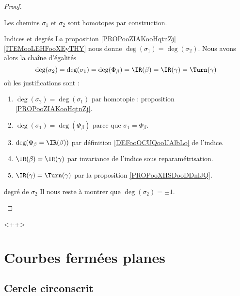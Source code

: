 \begin{proof}
\begin{subproof}
            Les chemins \( \sigma_1\) et \( \sigma_2\) sont homotopes par construction.
        \item[Indices et degrés]
            La proposition \ref{PROPooZIAKooHqtnZj}\ref{ITEMooLEHFooXEyTHY} nous donne \( \deg(\sigma_1)=\deg(\sigma_2)\). Nous avons alors la chaîne d'égalités
            \begin{equation}
                \deg(\sigma_2)=\deg(\sigma_1)=\deg(\Phi_{\beta})=\IR(\beta)=\IR(\gamma)=\Turn(\gamma)
            \end{equation}
            où les justifications sont :
            \begin{enumerate}
                \item
                    \( \deg(\sigma_2)=\deg(\sigma_1)\) par homotopie : proposition \ref{PROPooZIAKooHqtnZj}.
                \item
                    \( \deg(\sigma_1)=\deg(\Phi_{\beta})\) parce que \( \sigma_1=\Phi_{\beta}\).
                \item
                    \( \deg(\Phi_{\beta}=\IR(\beta))\) par définition \ref{DEFooOCUQooUAlbLo} de l'indice.
                \item
                    \(  \IR(\beta)=\IR(\gamma) \) par invariance de l'indice sous reparamétrisation.
                \item
                    \( \IR(\gamma)=\Turn(\gamma)\) par la proposition \ref{PROPooXHSDooDDnlJQ}.
            \end{enumerate}
        \item[degré de \( \sigma_2\)]
            Il nous reste à montrer que \( \deg(\sigma_2)=\pm 1\).
    \end{subproof}
\end{proof}
<++>

\section{Courbes fermées planes}

\subsection{Cercle circonscrit}

